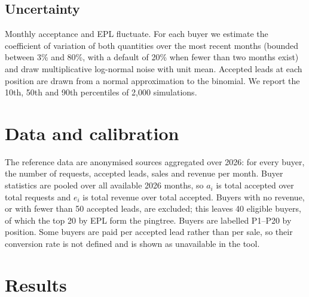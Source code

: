 \documentclass[10pt,a4paper]{article}
\begin{document}
\subsection{Uncertainty}
Monthly acceptance and EPL fluctuate. For each buyer we estimate the coefficient of variation of both quantities over the most recent months (bounded between 3\% and 80\%, with a default of 20\% when fewer than two months exist) and draw multiplicative log-normal noise with unit mean. Accepted leads at each position are drawn from a normal approximation to the binomial. We report the 10th, 50th and 90th percentiles of 2{,}000 simulations.

\section{Data and calibration}
The reference data are anonymised sources aggregated over 2026: for every buyer, the number of requests, accepted leads, sales and revenue per month. Buyer statistics are pooled over all available 2026 months, so $a_i$ is total accepted over total requests and $e_i$ is total revenue over total accepted. Buyers with no revenue, or with fewer than 50 accepted leads, are excluded; this leaves 40 eligible buyers, of which the top 20 by EPL form the pingtree. Buyers are labelled P1--P20 by position. Some buyers are paid per accepted lead rather than per sale, so their conversion rate is not defined and is shown as unavailable in the tool.

\section{Results}
\end{document}
